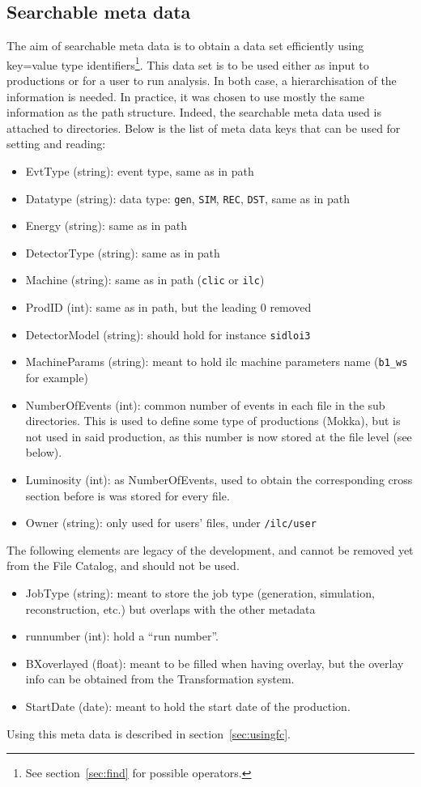 \documentclass[11pt,a4paper]{scrartcl}
\begin{document}
\subsection{Searchable meta data}
The aim of searchable meta data is to obtain a data set efficiently using
key=value type identifiers\footnote{See section~\ref{sec:find} for possible
operators.}. This data set is to be used either as input to productions or for a
user to run analysis. In both case, a hierarchisation of the information is
needed.  In practice, it was chosen to use mostly the same information as the
path structure. Indeed, the searchable meta data used is attached to
directories. Below is the list of meta data keys that can be used for setting
and reading:
\begin{itemize}
  \item EvtType (string): event type, same as in path
  \item Datatype (string): data type: \lstinline|gen|, \lstinline|SIM|,
  \lstinline|REC|, \lstinline|DST|, same as in path
  \item Energy (string): same as in path
  \item DetectorType (string): same as in path
  \item Machine (string): same as in path (\lstinline|clic| or \lstinline|ilc|)
  \item ProdID (int): same as in path, but the leading 0 removed
  \item DetectorModel (string): should hold for instance \lstinline|sidloi3|
  \item MachineParams (string): meant to hold ilc machine
  parameters name (\lstinline|b1_ws| for example)
  \item NumberOfEvents (int): common number of events in each file in the sub
  directories. This is used to define some type of productions (Mokka), but is
  not used in said production, as this number is now stored at the file level
  (see below).
  \item Luminosity (int): as NumberOfEvents, used to obtain the
  corresponding cross section before is was stored for every file.
  \item Owner (string): only used for users' files, under \lstinline|/ilc/user|
\end{itemize}
The following elements are legacy of the development, and cannot be removed yet
from the File Catalog, and should not be used.
\begin{itemize}
  \item JobType (string): meant to store the job type
  (generation, simulation, reconstruction, etc.) but overlaps with the other
  metadata
  \item runnumber (int): hold a ``run number''.
  \item BXoverlayed (float): meant to be filled when having
  overlay, but the overlay info can be obtained from the Transformation system. 
  \item StartDate (date): meant to hold the start date of the
  production.
\end{itemize}
Using this meta data is described in section~\ref{sec:usingfc}. 
\end{document}
